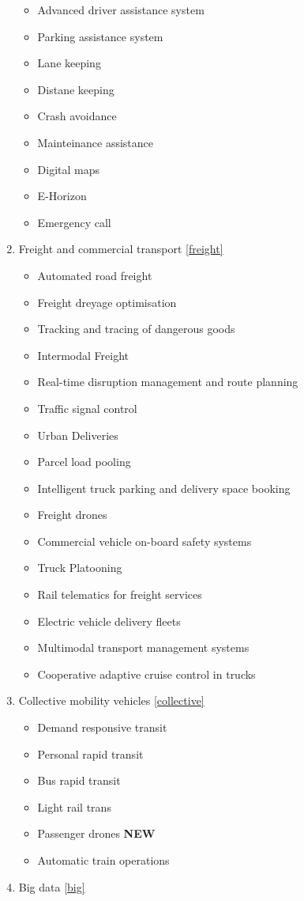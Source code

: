 \documentclass[
]{book}
\providecommand{\tightlist}{%
  \setlength{\itemsep}{0pt}\setlength{\parskip}{0pt}}
\begin{document}
\begin{enumerate}
  \begin{itemize}
  \tightlist
  \item
    Advanced driver assistance system
  \item
    Parking assistance system
  \item
    Lane keeping
  \item
    Distane keeping
  \item
    Crash avoidance
  \item
    Mainteinance assistance
  \item
    Digital maps
  \item
    E-Horizon
  \item
    Emergency call
  \end{itemize}
\item
  Freight and commercial transport \ref{freight}

  \begin{itemize}
  \tightlist
  \item
    Automated road freight
  \item
    Freight dreyage optimisation
  \item
    Tracking and tracing of dangerous goods
  \item
    Intermodal Freight
  \item
    Real-time disruption management and route planning
  \item
    Traffic signal control
  \item
    Urban Deliveries
  \item
    Parcel load pooling
  \item
    Intelligent truck parking and delivery space booking
  \item
    Freight drones
  \item
    Commercial vehicle on-board safety systems
  \item
    Truck Platooning
  \item
    Rail telematics for freight services
  \item
    Electric vehicle delivery fleets
  \item
    Multimodal transport management systems
  \item
    Cooperative adaptive cruise control in trucks
  \end{itemize}
\item
  Collective mobility vehicles \ref{collective}

  \begin{itemize}
  \tightlist
  \item
    Demand responsive transit
  \item
    Personal rapid transit
  \item
    Bus rapid transit
  \item
    Light rail trans
  \item
    Passenger drones \textbf{NEW}
  \item
    Automatic train operations
  \end{itemize}
\item
  Big data \ref{big}


\end{enumerate}
\end{document}
